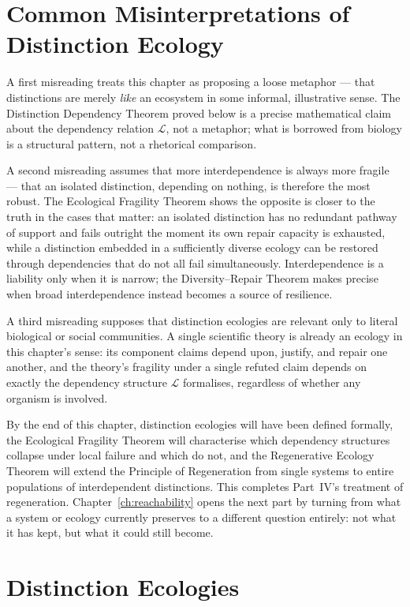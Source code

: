 \documentclass[12pt,twoside,openright]{book}
\begin{document}
\section{Common Misinterpretations of Distinction Ecology}
\label{sec:ch12-misinterpretations}

A first misreading treats this chapter as proposing a loose
metaphor --- that distinctions are merely \emph{like} an
ecosystem in some informal, illustrative sense. The
Distinction Dependency Theorem proved below is a precise
mathematical claim about the dependency relation
$\mathcal{L}$, not a metaphor; what is borrowed from biology
is a structural pattern, not a rhetorical comparison.

A second misreading assumes that more interdependence is
always more fragile --- that an isolated distinction,
depending on nothing, is therefore the most robust. The
Ecological Fragility Theorem shows the opposite is closer to
the truth in the cases that matter: an isolated distinction
has no redundant pathway of support and fails outright the
moment its own repair capacity is exhausted, while a
distinction embedded in a sufficiently diverse ecology can be
restored through dependencies that do not all fail
simultaneously. Interdependence is a liability only when it
is narrow; the Diversity--Repair Theorem makes precise when
broad interdependence instead becomes a source of resilience.

A third misreading supposes that distinction ecologies are
relevant only to literal biological or social communities. A
single scientific theory is already an ecology in this
chapter's sense: its component claims depend upon, justify,
and repair one another, and the theory's fragility under a
single refuted claim depends on exactly the dependency
structure $\mathcal{L}$ formalises, regardless of whether any
organism is involved.

By the end of this chapter, distinction ecologies will have
been defined formally, the Ecological Fragility Theorem will
characterise which dependency structures collapse under
local failure and which do not, and the Regenerative Ecology
Theorem will extend the Principle of Regeneration from single
systems to entire populations of interdependent distinctions.
This completes Part~IV's treatment of regeneration.
Chapter~\ref{ch:reachability} opens the next part by turning
from what a system or ecology currently preserves to a
different question entirely: not what it has kept, but what
it could still become.

\section{Distinction Ecologies}
\label{sec:ch12-ecologies}
\end{document}
